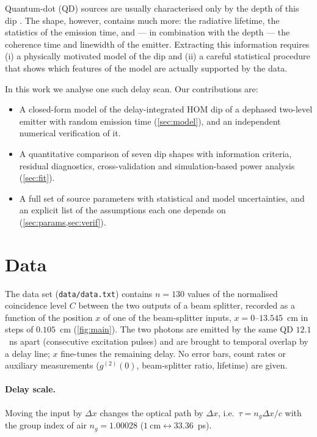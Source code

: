 \documentclass{article}
\begin{document}
Quantum-dot (QD) sources are usually characterised only by the depth of this
dip \cite{Somaschi2016,Ding2016}. The shape, however, contains much more:
the radiative lifetime, the statistics of the emission time, and --- in
combination with the depth --- the coherence time and linewidth of the
emitter. Extracting this information requires (i) a physically motivated
model of the dip and (ii) a careful statistical procedure that shows which
features of the model are actually supported by the data.

In this work we analyse one such delay scan. Our contributions are:
\begin{itemize}
\item A closed-form model of the delay-integrated HOM dip of a dephased
two-level emitter with random emission time (\cref{sec:model}), and an
independent numerical verification of it.
\item A quantitative comparison of seven dip shapes with information criteria,
residual diagnostics, cross-validation and simulation-based power analysis
(\cref{sec:fit}).
\item A full set of source parameters with statistical and model
uncertainties, and an explicit list of the assumptions each one depends on
(\cref{sec:params,sec:verif}).
\end{itemize}

\section{Data}
\label{sec:data}

The data set (\texttt{data/data.txt}) contains $n=130$ values of the
normalised coincidence level $C$ between the two outputs of a beam splitter,
recorded as a function of the position $x$ of one of the beam-splitter
inputs, $x=0$--$13.545$~cm in steps of $0.105$~cm (\cref{fig:main}). The two
photons are emitted by the same QD $12.1$~ns apart (consecutive excitation
pulses) and are brought to temporal overlap by a delay line; $x$ fine-tunes
the remaining delay. No error bars, count rates or auxiliary measurements
($g^{(2)}(0)$, beam-splitter ratio, lifetime) are given.

\paragraph{Delay scale.} Moving the input by $\Delta x$ changes the optical path
by $\Delta x$, i.e.\
$\tau = n_g \Delta x/c$ with the group index of air $n_g=1.00028$
($1~\mathrm{cm}\leftrightarrow 33.36$~ps).
\end{document}
